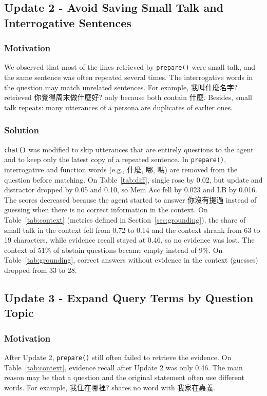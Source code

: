 \documentclass{article}
\begin{document}
\subsection{Update 2 - Avoid Saving Small Talk and Interrogative Sentences}
\subsubsection{Motivation}
We observed that most of the lines retrieved by \texttt{prepare()} were small talk, and the same sentence was often repeated several times.
The interrogative words in the question may match unrelated sentences.
For example, 我叫什麼名字? retrieved 你覺得周末做什麼好? only because both contain 什麼.
Besides, small talk repeats: many utterances of a persona are duplicates of earlier ones.
\subsubsection{Solution}
\texttt{chat()} was modified to skip utterances that are entirely questions to the agent and to keep only the latest copy of a repeated sentence.
In \texttt{prepare()}, interrogative and function words (e.g., 什麼, 哪, 嗎) are removed from the question before matching.
On Table~\ref{tab:diff}, single rose by 0.02, but update and distractor dropped by 0.05 and 0.10, so Mem Acc fell by 0.023 and LB by 0.016.
The scores decreased because the agent started to answer 你沒有提過 instead of guessing when there is no correct information in the context.
On Table~\ref{tab:context} (metrics defined in Section~\ref{sec:grounding}), the share of small talk in the context fell from 0.72 to 0.14 and the context shrank from 63 to 19 characters, while evidence recall stayed at 0.46, so no evidence was lost.
The context of 51\% of abstain questions became empty instead of 9\%.
On Table~\ref{tab:grounding}, correct answers without evidence in the context (guesses) dropped from 33 to 28.
\subsection{Update 3 - Expand Query Terms by Question Topic}
\subsubsection{Motivation}
After Update 2, \texttt{prepare()} still often failed to retrieve the evidence.
On Table~\ref{tab:context}, evidence recall after Update 2 was only 0.46.
The main reason may be that a question and the original statement often use different words.
For example, 我住在哪裡? shares no word with 我家在嘉義.
\end{document}
